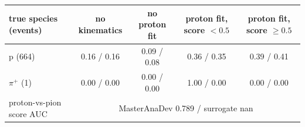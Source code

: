 \begin{tabular}{lcccc}
\toprule
true species (events) & no kinematics & no proton fit & proton fit, score $<0.5$ & proton fit, score $\geq 0.5$ \\
\midrule
p (664) & 0.16 / 0.16 & 0.09 / 0.08 & 0.36 / 0.35 & 0.39 / 0.41 \\
$\pi^+$ (1) & 0.00 / 0.00 & 0.00 / 0.00 & 1.00 / 0.00 & 0.00 / 0.00 \\
\midrule
proton-vs-pion score AUC & \multicolumn{4}{c}{MasterAnaDev 0.789 / surrogate nan} \\
\bottomrule
\end{tabular}
